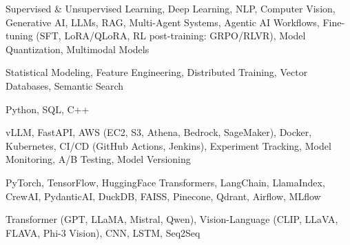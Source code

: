 \documentclass[letter,10pt]{article}
\begin{document}
 Supervised \& Unsupervised Learning, Deep Learning, NLP, Computer Vision, Generative AI, LLMs, RAG, Multi-Agent Systems, Agentic AI Workflows, Fine-tuning (SFT, LoRA/QLoRA, RL post-training: GRPO/RLVR), Model Quantization, Multimodal Models\par\vspace{2pt}

 Statistical Modeling, Feature Engineering, Distributed Training, Vector Databases, Semantic Search\par\vspace{2pt}

 Python, SQL, C++\par\vspace{2pt}

 vLLM, FastAPI, AWS (EC2, S3, Athena, Bedrock, SageMaker), Docker, Kubernetes, CI/CD (GitHub Actions, Jenkins), Experiment Tracking, Model Monitoring, A/B Testing, Model Versioning\par\vspace{2pt}

 PyTorch, TensorFlow, HuggingFace Transformers, LangChain, LlamaIndex, CrewAI, PydanticAI, DuckDB, FAISS, Pinecone, Qdrant, Airflow, MLflow\par\vspace{2pt}

 Transformer (GPT, LLaMA, Mistral, Qwen), Vision-Language (CLIP, LLaVA, FLAVA, Phi-3 Vision), CNN, LSTM, Seq2Seq
\end{document}
